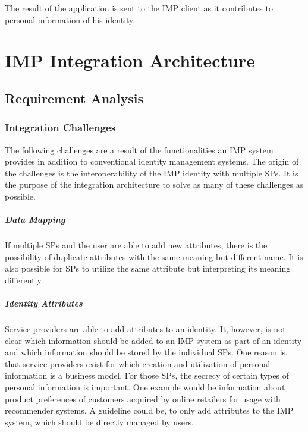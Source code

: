 \documentclass[
     12pt,         %
     a4paper,      %
     BCOR=10mm,version=first,     %
     DIV=14,version=first,        %
     ]{scrreprt}
\begin{document}
The result of the application is sent to the IMP client as it contributes to personal information of his identity.

\chapter{IMP Integration Architecture}

\section{Requirement Analysis}

\subsection{Integration Challenges}

The following challenges are a result of the functionalities an IMP system provides in addition to conventional identity management systems. The origin of the challenges is the interoperability of the IMP identity with multiple SPs. It is the purpose of the integration architecture to solve as many of these challenges as possible.

\paragraph{Data Mapping}
If multiple SPs and the user are able to add new attributes, there is the possibility of duplicate attributes with the same meaning but different name. It is also possible for SPs to utilize the same attribute but interpreting its meaning differently.

\paragraph{Identity Attributes}
Service providers are able to add attributes to an identity. It, however, is not clear which information should be added to an IMP system as part of an identity and which information should be stored by the individual SPs. One reason is, that service providers exist for which creation and utilization of personal information is a business model. For those SPs, the secrecy of certain types of personal information is important. One example would be information about product preferences of customers acquired by online retailers for usage with recommender systems.
A guideline could be, to only add attributes to the IMP system, which should be directly managed by users.
\end{document}
